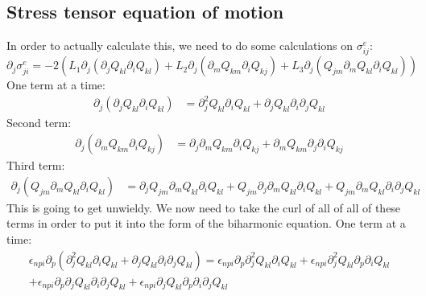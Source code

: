 \documentclass[reqno]{article}
\begin{document}
	\subsection{Stress tensor equation of motion}
	In order to actually calculate this, we need to do some calculations on $\sigma^e_{ij}$:
	\begin{equation}
		\partial_j \sigma^{e}_{ji} = 
		-2 \left(
		L_1 \partial_j \left(\partial_j Q_{kl} \partial_i Q_{kl}\right)
		+ L_2 \partial_j \left(\partial_m Q_{km} \partial_i Q_{kj}\right)
		+ L_3 \partial_j \left(Q_{jm} \partial_m Q_{kl} \partial_i Q_{kl}\right)
		\right)
	\end{equation}
	One term at a time:
	\begin{equation}
	\begin{split}
		\partial_j \left(\partial_j Q_{kl} \partial_i Q_{kl}\right)
		&= \partial_j^2 Q_{kl} \partial_i Q_{kl} 
		+ \partial_j Q_{kl} \partial_i \partial_j Q_{kl}
	\end{split}
	\end{equation}
	Second term:
	\begin{equation}
	\begin{split}
		\partial_j \left(\partial_m Q_{km} \partial_i Q_{kj} \right)
		&= \partial_j \partial_m Q_{km} \partial_i Q_{kj}
		+ \partial_m Q_{km} \partial_j \partial_i Q_{kj}
	\end{split}
	\end{equation}
	Third term:
	\begin{equation}
	\begin{split}
		\partial_j \left(Q_{jm} \partial_m Q_{kl} \partial_i Q_{kl} \right)
		&= \partial_j Q_{jm} \partial_m Q_{kl} \partial_i Q_{kl}
		+ Q_{jm} \partial_j \partial_m Q_{kl} \partial_i Q_{kl}
		+ Q_{jm} \partial_m Q_{kl} \partial_i \partial_j Q_{kl}
	\end{split}
	\end{equation}
	This is going to get unwieldy. 
	We now need to take the curl of all of all of these terms in order to put it into the form of the biharmonic equation.
	One term at a time:
	\begin{multline}
		\epsilon_{npi} \partial_p \left(
		\partial_j^2 Q_{kl} \partial_i Q_{kl} 
		+ \partial_j Q_{kl} \partial_i \partial_j Q_{kl}
		\right)
		= \epsilon_{npi} \partial_p \partial_j^2 Q_{kl} \partial_i Q_{kl}
		+ \epsilon_{npi} \partial_j^2 Q_{kl} \partial_p \partial_i Q_{kl} \\
		+ \epsilon_{npi} \partial_p \partial_j Q_{kl} \partial_i \partial_j Q_{kl}
		+ \epsilon_{npi} \partial_j Q_{kl} \partial_p \partial_i \partial_j Q_{kl}
	\end{multline}
\end{document}
